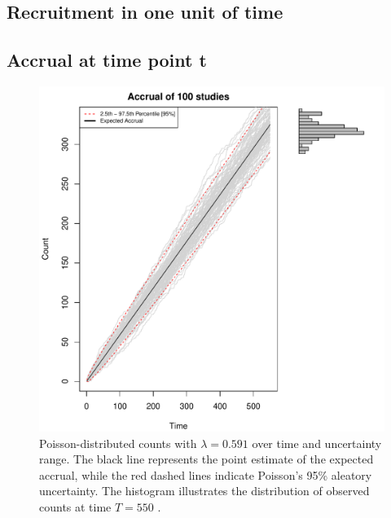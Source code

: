 \subsection{Recruitment in one unit of time}
\subsection{Accrual at time point t}

\begin{figure}
\begin{knitrout}
\color{fgcolor}

{\centering \includegraphics[width=\textwidth-3cm]{figure/ch02_figunnamed-chunk-3-1} 

}


\end{knitrout}
  \caption{Poisson-distributed counts with $\lambda = 0.591$ over time and uncertainty range. The black line represents the point estimate of the expected accrual, while the red dashed lines indicate Poisson's 95\% aleatory uncertainty. The histogram illustrates the distribution of observed counts at time $T = 550$ \citep{spiegelhalter2011visualizing}.}
  \label{fig:2_2}
\end{figure}


